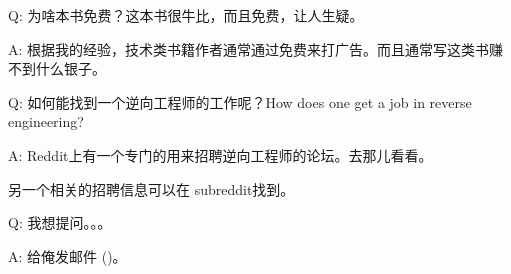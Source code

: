 \documentclass[UTF8,nofonts]{ctexart}
\begin{document}
\par Q: 为啥本书免费？这本书很牛比，而且免费，让人生疑。
\par A:  根据我的经验，技术类书籍作者通常通过免费来打广告。而且通常写这类书赚不到什么银子。

\par Q: 如何能找到一个逆向工程师的工作呢？How does one get a job in reverse engineering?
\par A: Reddit上有一个专门的用来招聘逆向工程师的论坛\FNURLREDDIT{}。去那儿看看。

另一个相关的招聘信息可以在 subreddit找到。


\par Q: 我想提问。。。
\par A: 给俺发邮件 (\EMAIL)。
\end{document}
